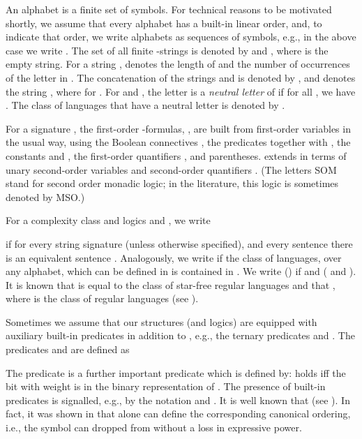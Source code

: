 \documentclass{LMCS}
\begin{document}
An alphabet  is a finite set of symbols. For technical reasons to be motivated shortly, we assume that every alphabet  has a built-in linear
order, and, to indicate that order, we write alphabets as sequences of symbols, e.g., in the above case we write . 
The set of all finite -strings is denoted by 
and , where  is the empty string. For a string ,  denotes the length of  and     the number of occurrences of  the letter  in . The concatenation of the strings  and  is denoted by , and  denotes the string , where  for .  
For  and , the letter  is a {\em neutral letter} of  if  for all , we have . The class of languages that have a neutral letter is denoted by .


For a signature , the first-order -formulas, , are built
 from first-order variables in the usual way, using the Boolean connectives , the  predicates  together with , the
constants  and , the first-order  quantifiers
, and parentheses.  extends  in terms of
unary second-order variables and second-order quantifiers .
(The letters SOM stand for second order monadic logic; in
the literature, this logic is sometimes denoted by MSO.) 

For a complexity class  and logics  and , we write 
  
 if for every string signature  (unless otherwise specified), and every sentence  there is an equivalent sentence  . Analogously, we write   if the class of languages, over any alphabet, which can be defined in  is contained in  . We write    ()  if    and   (   and  ).
It is known \cite{mcpa71} that  is equal to the class
of star-free regular languages and that , where   is the class of  regular languages (see \cite{buel58,bue62,tra61}).

Sometimes we assume that our structures (and logics) are  equipped with auxiliary built-in
predicates in addition to , e.g.,  the ternary predicates  and . The predicates   and  are defined as

The predicate  is a further important predicate which is defined  by:  holds iff the bit with weight   is  in the binary representation of . The presence of  built-in predicates is signalled, e.g., by  the notation  and . It is well known that   (see \cite{imm99}).   In fact,
it was shown in \cite{DDLW} that  alone can define the corresponding canonical ordering, i.e.,  the symbol   can  dropped from   without a loss in expressive power.  
\end{document}
